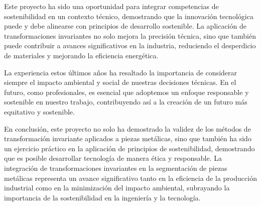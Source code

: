 Este proyecto ha sido una oportunidad para integrar competencias de sostenibilidad en un contexto técnico, demostrando que la innovación tecnológica puede y debe alinearse con principios de desarrollo sostenible. La aplicación de transformaciones invariantes no solo mejora la precisión técnica, sino que también puede contribuir a avances significativos en la industria, reduciendo el desperdicio de materiales y mejorando la eficiencia energética.

La experiencia estos últimos años ha resaltado la importancia de considerar siempre el impacto ambiental y social de nuestras decisiones técnicas. En el futuro, como profesionales, es esencial que adoptemos un enfoque responsable y sostenible en nuestro trabajo, contribuyendo así a la creación de un futuro más equitativo y sostenible.

En conclusión, este proyecto no solo ha demostrado la validez de los métodos de transformación invariante aplicados a piezas metálicas, sino que también ha sido un ejercicio práctico en la aplicación de principios de sostenibilidad, demostrando que es posible desarrollar tecnología de manera ética y responsable. La integración de transformaciones invariantes en la segmentación de piezas metálicas representa un avance significativo tanto en la eficiencia de la producción industrial como en la minimización del impacto ambiental, subrayando la importancia de la sostenibilidad en la ingeniería y la tecnología.

